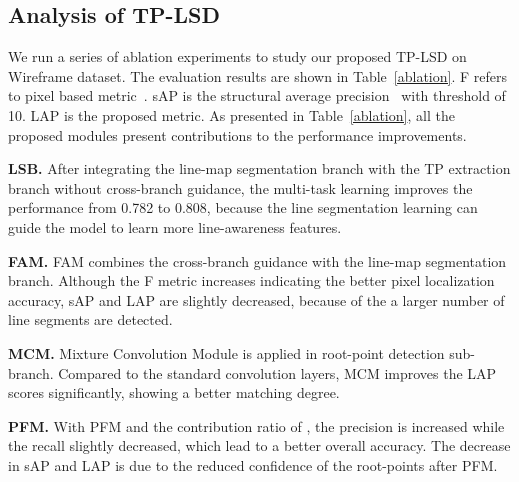 \documentclass[runningheads]{llncs}
\begin{document}
\subsection{Analysis of TP-LSD}
\label{ablationstudy}
We run a series of ablation experiments to
study our proposed TP-LSD on Wireframe dataset. The evaluation results are shown in Table~\ref{ablation}. F refers to pixel based metric~\cite{Wireframe}. sAP is the structural average precision~\cite{LCNN} with threshold of 10. LAP is the proposed metric. As presented in Table~\ref{ablation}, all the proposed modules present contributions to the performance improvements.

\textbf{LSB.} After integrating the line-map segmentation branch with the TP extraction branch without cross-branch guidance, the multi-task learning improves the performance from 0.782 to 0.808, because the line segmentation learning can guide the model to learn more line-awareness features.

\textbf{FAM.} FAM combines the cross-branch guidance with the line-map segmentation branch. Although the F metric increases indicating the better pixel localization accuracy, sAP and LAP are slightly decreased, because of the a larger number of line segments are detected.

\textbf{MCM.} Mixture Convolution Module is applied in root-point detection sub-branch. Compared to the standard convolution layers, MCM improves the LAP scores significantly, showing a better matching degree.

\textbf{PFM.} With PFM and the contribution ratio of , the precision is increased while the recall slightly decreased, which lead to a better overall accuracy. The decrease in sAP and LAP is due to the reduced confidence of the root-points after PFM.
\end{document}
